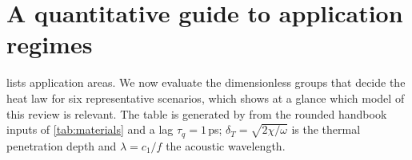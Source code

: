 \section{A quantitative guide to application regimes}\label{sec:scenarios}

 lists application areas. We now evaluate the dimensionless groups that decide the heat law for six representative scenarios, which shows at a glance which model of this review is relevant. The table is generated by  from the rounded handbook inputs of \cref{tab:materials} and a lag $\tau_q=1$\,ps; $\delta_T=\sqrt{2\chi/\omega}$ is the thermal penetration depth and $\lambda=c_1/f$ the acoustic wavelength.

\begin{table}[ht]\centering\scriptsize
\caption{Dimensionless groups for six scenarios ($T_0=300$\,K, $\tau_q=1$\,ps). The assessment column applies the rule: Fourier is adequate if $\omega\tau_q<0.1$ and $\omega/\omega_*<0.1$; a lag law may matter if $\omega\tau_q<1.5$ but then the kinetic validity of the model must be checked; otherwise the continuum heat law itself is questionable.}\label{tab:scenarios}

\end{table}

